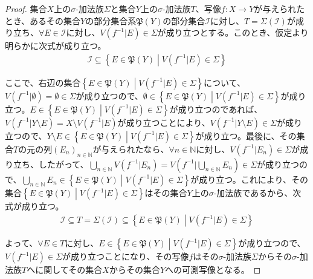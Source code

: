 \documentclass[dvipdfmx]{jsarticle}
\begin{document}
\begin{proof}
集合$X$上の$\sigma$-加法族$\varSigma$と集合$Y$上の$\sigma$-加法族$T$、写像$f:X \rightarrow Y$が与えられたとき、あるその集合$Y$の部分集合系$\mathfrak{P}(Y)$の部分集合$\mathcal{I}$に対し、$T = \varSigma\left( \mathcal{I} \right)$が成り立ち、$\forall E\in \mathcal{I}$に対し、$V\left( f^{- 1}|E \right) \in \varSigma$が成り立つとする。このとき、仮定より明らかに次式が成り立つ。
\begin{align*}
\mathcal{I \subseteq}\left\{ E \in \mathfrak{P}(Y) \middle| V\left( f^{- 1}|E \right) \in \varSigma \right\}
\end{align*}\par
ここで、右辺の集合$\left\{ E \in \mathfrak{P}(Y) \middle| V\left( f^{- 1}|E \right) \in \varSigma \right\}$について、$V\left( f^{- 1}|\emptyset \right) = \emptyset \in \varSigma$が成り立つので、$\emptyset \in \left\{ E \in \mathfrak{P}(Y) \middle| V\left( f^{- 1}|E \right) \in \varSigma \right\}$が成り立つ。$E \in \left\{ E \in \mathfrak{P}(Y) \middle| V\left( f^{- 1}|E \right) \in \varSigma \right\}$が成り立つのであれば、$V\left( f^{- 1}|Y \setminus E \right) = X \setminus V\left( f^{- 1}|E \right)$が成り立つことにより、$V\left( f^{- 1}|Y \setminus E \right) \in \varSigma$が成り立つので、$Y \setminus E \in \left\{ E \in \mathfrak{P}(Y) \middle| V\left( f^{- 1}|E \right) \in \varSigma \right\}$が成り立つ。最後に、その集合$T$の元の列$\left( E_{n} \right)_{n \in \mathbb{N}}$が与えられたなら、$\forall n \in \mathbb{N}$に対し、$V\left( f^{- 1}|E_{n} \right) \in \varSigma$が成り立ち、したがって、$\bigcup_{n \in \mathbb{N}} {V\left( f^{- 1}|E_{n} \right)} = V\left( f^{- 1}|\bigcup_{n \in \mathbb{N}} E_{n} \right) \in \varSigma$が成り立つので、$\bigcup_{n \in \mathbb{N}} E_{n} \in \left\{ E \in \mathfrak{P}(Y) \middle| V\left( f^{- 1}|E \right) \in \varSigma \right\}$が成り立つ。これにより、その集合$\left\{ E \in \mathfrak{P}(Y) \middle| V\left( f^{- 1}|E \right) \in \varSigma \right\}$はその集合$Y$上の$\sigma$-加法族であるから、次式が成り立つ。
\begin{align*}
\mathcal{I \subseteq}T = \varSigma\left( \mathcal{I} \right) \subseteq \left\{ E \in \mathfrak{P}(Y) \middle| V\left( f^{- 1}|E \right) \in \varSigma \right\}
\end{align*}\par
よって、$\forall E \in T$に対し、$E \in \left\{ E \in \mathfrak{P}(Y) \middle| V\left( f^{- 1}|E \right) \in \varSigma \right\}$が成り立つので、$V\left( f^{- 1}|E \right) \in \varSigma$が成り立つことになり、その写像$f$はその$\sigma$-加法族$\varSigma$からその$\sigma$-加法族$T$へに関してその集合$X$からその集合$Y$への可測写像となる。
\end{proof}
\end{document}
